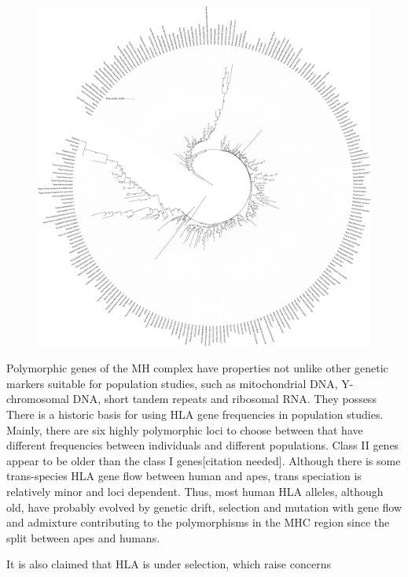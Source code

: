 \documentclass{article}
\begin{document}
\begin{figure}
    \centering
    \includegraphics[width=\textwidth]{Figures/maj_AB_nj_246_99.pdf}
    \label{treeAB}
\end{figure}

Polymorphic genes of the MH complex have properties not unlike other genetic markers suitable for 
population studies, such as mitochondrial DNA, Y-chromosomal DNA, short tandem repeats and ribosomal RNA. They possess 
There is a historic basis for using HLA gene frequencies in population studies. Mainly, there are six highly polymorphic
loci to choose between that have different frequencies between individuals and different populations. Class II genes
appear to be older than the class I genes[citation needed]. Although there is some trans-species HLA gene flow between human and apes,
trans speciation is relatively minor and loci dependent. Thus, most human HLA alleles, although old, have probably
evolved by genetic drift, selection and mutation with gene flow and admixture contributing to the polymorphisms in the
MHC region since the split between apes and humans.


It is also claimed that HLA is under selection, which raise concerns %
\end{document}
